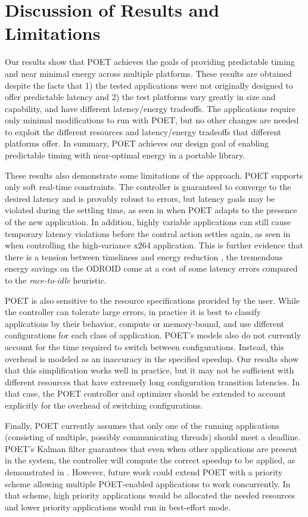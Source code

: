 \section{Discussion of Results and Limitations}

Our results show that POET achieves the goals of providing predictable timing and near minimal energy across multiple platforms.
These results are obtained despite the facts that 1) the tested applications were not originally designed to offer predictable latency and 2) the test platforms vary greatly in size and capability, and have different latency/energy tradeoffs.
The applications require only minimal modifications to run with POET, but no other changes are needed to exploit the different resources and latency/energy tradeoffs that different platforms offer.
In summary, POET achieves our design goal of enabling predictable timing with near-optimal energy in a portable library.

These results also demonstrate some limitations of the approach.
POET supports only soft real-time constraints.
The controller is guaranteed to converge to the desired latency and is provably robust to errors, but latency goals may be violated during the settling time, as seen in  when POET adapts to the presence of the new application.
In addition, highly variable applications can still cause temporary latency violations before the control action settles again, as seen in  when controlling the high-variance x264 application.
This is further evidence that there is a tension between timeliness and energy reduction \cite{Abeni}, \eg the tremendous energy savings on the ODROID come at a cost of some latency errors compared to the \emph{race-to-idle} heuristic.

POET is also sensitive to the resource specifications provided by the user.
While the controller can tolerate large errors, in practice it is best to classify applications by their behavior, \eg compute or memory-bound, and use different configurations for each class of application.
POET's models also do not currently account for the time required to switch between configurations.
Instead, this overhead is modeled as an inaccuracy in the specified speedup.
Our results show that this simplification works well in practice, but it may not be sufficient with different resources that have extremely long configuration transition latencies.
In that case, the POET controller and optimizer should be extended to account explicitly for the overhead of switching configurations.

Finally, POET currently assumes that only one of the running applications (consisting of multiple, possibly communicating threads) should meet a deadline.
POET's Kalman filter guarantees that even when other applications are present in the system, the controller will compute the correct speedup to be applied, as demonstrated in .
However, future work could extend POET with a priority scheme allowing multiple POET-enabled applications to work concurrently.
In that scheme, high priority applications would be allocated the needed resources and lower priority applications would run in best-effort mode.
